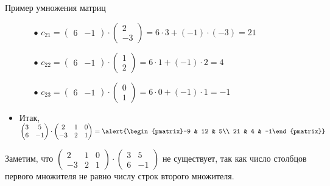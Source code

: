 \documentclass[unicode,11pt,notheorems]{beamer}
\begin{document}
\begin{frame}[allowframebreaks]{Пример умножения матриц}{}
\begin{itemize}
\begin{itemize}
		\item[$\bullet$] 
			 $c_{21} =  \begin{pmatrix}6 & -1 \end{pmatrix} \cdot \begin{pmatrix}2\\-3\end{pmatrix} = 6\cdot 3+(-1)\cdot(-3)=21$
		\item[$\bullet$] 
			 $c_{22} =  \begin{pmatrix}6 & -1 \end{pmatrix} \cdot \begin{pmatrix}1\\2\end{pmatrix} = 6\cdot 1+(-1)\cdot 2=4$
		\item[$\bullet$] 
			 $c_{23} =  \begin{pmatrix}6 & -1 \end{pmatrix} \cdot \begin{pmatrix}0\\1\end{pmatrix} = 6\cdot 0+(-1)\cdot 1=-1$
		 \end{itemize}
	\item 
	Итак,
		$\begin{pmatrix}3&5\\6&-1\end{pmatrix} \cdot \begin{pmatrix}2&1 & 0\\-3&2 & 1\end{pmatrix}
		= \alert{\begin{pmatrix}-9 & 12 & 5\\ 21 & 4 & -1\end{pmatrix}}$		
	\end{itemize}
\begin{alertblock}{}
Заметим, что 
$
\begin{pmatrix}2&1 & 0\\-3&2 & 1\end{pmatrix}\cdot\begin{pmatrix}3&5\\6&-1\end{pmatrix}
$ не существует, так как число столбцов первого множителя не равно числу строк второго множителя. 

\end{alertblock}
\end{frame}
\end{document}
